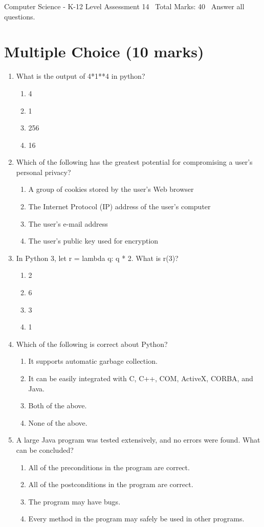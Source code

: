 \documentclass[12pt]{article}
\begin{document}
\begin{center}
Computer Science - K-12 Level Assessment 14 \
Total Marks: 40 \
Answer all questions.
\end{center}

\section*{Multiple Choice (10 marks)}
\begin{enumerate}[label=\arabic*.]
\item What is the output of 4*1**4 in python?
\begin{enumerate}[label=(\alph*)]
    \item 4
    \item 1
    \item 256
    \item 16
\end{enumerate}
\item Which of the following has the greatest potential for compromising a user's personal privacy?
\begin{enumerate}[label=(\alph*)]
    \item A group of cookies stored by the user's Web browser
    \item The Internet Protocol (IP) address of the user's computer
    \item The user's e-mail address
    \item The user's public key used for encryption
\end{enumerate}
\item In Python 3, let r = lambda q: q * 2. What is r(3)?
\begin{enumerate}[label=(\alph*)]
    \item 2
    \item 6
    \item 3
    \item 1
\end{enumerate}
\item Which of the following is correct about Python?
\begin{enumerate}[label=(\alph*)]
    \item It supports automatic garbage collection.
    \item It can be easily integrated with C, C++, COM, ActiveX, CORBA, and Java.
    \item Both of the above.
    \item None of the above.
\end{enumerate}
\item A large Java program was tested extensively, and no errors were found. What can be concluded?
\begin{enumerate}[label=(\alph*)]
    \item All of the preconditions in the program are correct.
    \item All of the postconditions in the program are correct.
    \item The program may have bugs.
    \item Every method in the program may safely be used in other programs.
\end{enumerate}
\end{enumerate}
\end{document}
